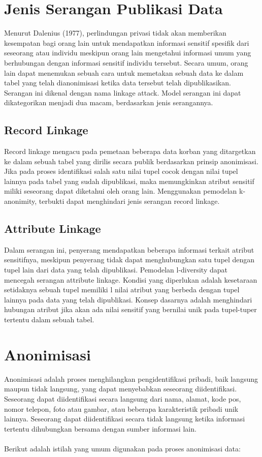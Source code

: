 \section{Jenis Serangan Publikasi Data} 
Menurut Dalenius (1977), perlindungan privasi tidak akan memberikan kesempatan bagi orang lain untuk mendapatkan informasi sensitif spesifik dari seseorang atau individu meskipun orang lain mengetahui informasi umum yang berhubungan dengan informasi sensitif individu tersebut. Secara umum, orang lain dapat menemukan sebuah cara untuk memetakan sebuah data ke dalam tabel yang telah dianonimisasi ketika data tersebut telah dipublikasikan. Serangan ini dikenal dengan nama linkage attack. Model serangan ini dapat dikategorikan menjadi dua macam, berdasarkan jenis serangannya.

\subsection{Record Linkage}
Record linkage mengacu pada pemetaan beberapa data korban yang ditargetkan ke dalam sebuah tabel yang dirilis secara publik berdasarkan prinsip anonimisasi. Jika pada proses identifikasi salah satu nilai tupel cocok dengan nilai tupel lainnya pada tabel yang sudah dipublikasi, maka memungkinkan atribut sensitif miliki seseorang dapat diketahui oleh orang lain. Menggunakan pemodelan k-anonimity, terbukti dapat menghindari jenis serangan record linkage.

\subsection{Attribute Linkage} 
Dalam serangan ini, penyerang mendapatkan beberapa informasi terkait atribut sensitifnya, meskipun penyerang tidak dapat menghubungkan satu tupel dengan tupel lain dari data yang telah dipublikasi. Pemodelan  l-diversity dapat mencegah serangan attribute linkage. Kondisi yang diperlukan adalah kesetaraan setidaknya sebuah tupel memiliki l nilai atribut yang berbeda dengan tupel lainnya pada data yang telah dipublikasi. Konsep dasarnya adalah menghindari hubungan atribut jika akan ada nilai sensitif yang bernilai unik pada tupel-tuper tertentu dalam sebuah tabel.

\section{Anonimisasi}
Anonimisasi adalah proses menghilangkan pengidentifikasi pribadi, baik langsung maupun tidak langsung, yang dapat menyebabkan seseorang diidentifikasi. Seseorang dapat diidentifikasi secara langsung dari nama, alamat, kode pos, nomor telepon, foto atau gambar, atau beberapa karakteristik pribadi unik lainnya. Seseorang dapat diidentifikasi secara tidak langsung ketika informasi tertentu dihubungkan bersama dengan sumber informasi lain.
\\\\
Berikut adalah istilah yang umum digunakan pada proses anonimisasi data: 

